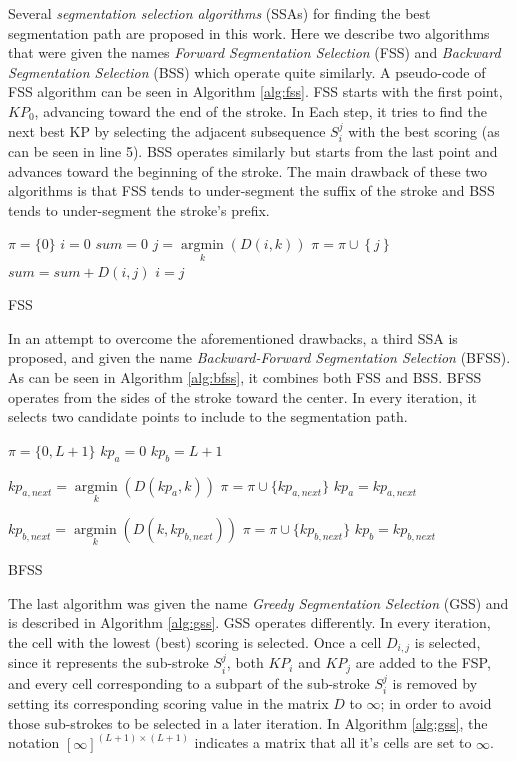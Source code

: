 \documentclass[10pt, conference, compsocconf]{IEEEtran}
\begin{document}
Several \emph{segmentation selection algorithms} (SSAs) for finding the best segmentation path are proposed in this work.
Here we describe two algorithms that were given the names \emph{Forward Segmentation Selection} (FSS) and \emph{Backward Segmentation Selection} (BSS) which operate quite similarly. 
A pseudo-code of FSS algorithm can be seen in Algorithm \ref{alg:fss}. 
FSS starts with the first point, $KP_0$, advancing toward the end of the stroke. 
In Each step, it tries to find the next best KP by selecting the adjacent subsequence $S_i^j$ with the best scoring (as can be seen in line 5). 
BSS operates similarly but starts from the last point and advances toward the beginning of the stroke. 
The main drawback of these two algorithms is that FSS tends to under-segment the suffix of the stroke and BSS tends to under-segment the stroke's prefix.\\

\begin{algorithm}
$\pi = \{0\} $\;
$i=0$\;
$sum=0$\;
{
	$j = \mathop {\arg \min }\limits_k \left( {D\left( {i,k} \right)} \right)$\;
	$\pi = \pi \cup \left\{ j \right\}$\;
	$sum = sum + D\left( {i,j} \right)$\;
	$i=j$\;
}
\caption{FSS}
\label{alg:fss}
\end{algorithm}

In an attempt to overcome the aforementioned drawbacks, a third SSA is proposed, and given the name \emph{Backward-Forward Segmentation Selection} (BFSS). 
As can be seen in Algorithm \ref{alg:bfss}, it combines both FSS and BSS. 
BFSS operates from the sides of the stroke toward the center. In every iteration, it selects two candidate points to include to the segmentation path.

\begin{algorithm}
$\pi = \{0,L+1\}$\;
$kp_{a}=0$\;
$kp_{b}=L+1$\;
{
	$kp_{a,next} = \mathop {\arg \min}\limits_k (D(kp_a,k))$\;
	$\pi = \pi \cup \{kp_{a,next}\}$\;
	$kp_{a}=kp_{a,next}$\;
	
	$kp_{b,next} = \mathop {\arg \min}\limits_k (D(k,kp_{b,next}))$\;
	$\pi = \pi \cup \{kp_{b,next}\}$\;	
	$kp_{b}=kp_{b,next}$\;
}
\caption{BFSS}
\label{alg:bfss}
\end{algorithm}
  
The last algorithm was given the name \emph{Greedy Segmentation Selection} (GSS) and is described in Algorithm \ref{alg:gss}.
GSS operates differently. In every iteration, the cell with the lowest (best) scoring is selected. 
Once a cell $D_{i,j}$ is selected, since it represents the sub-stroke $S_{i}^{j}$, both $KP_{i}$ and $KP_{j}$ are added to the FSP, and every cell corresponding to a subpart of the sub-stroke $S_{i}^{j}$ is removed by setting its corresponding scoring value in the matrix $D$ to $\infty$; in order to avoid those sub-strokes to be selected in a later iteration. In Algorithm \ref{alg:gss}, the notation $[\infty]^{(L+1)\times (L+1)}$ indicates a matrix that all it's cells are set to $\infty$.
 
\end{document}
